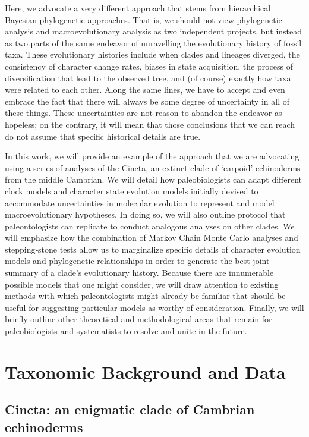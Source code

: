\documentclass{article}
\begin{document}
Here, we advocate a very different approach that stems from hierarchical Bayesian phylogenetic approaches.  
That is, we should not view phylogenetic analysis and macroevolutionary analysis as two independent projects, but instead as two parts of the same endeavor of unravelling the evolutionary history of fossil taxa.  
These evolutionary histories include when clades and lineages diverged, the consistency of character change rates, biases in state acquisition, the process of diversification that lead to the observed tree, and (of course) exactly how taxa were related to each other.  
Along the same lines, we have to accept and even embrace the fact that there will always be some degree of uncertainty in all of these things.  
These uncertainties are not reason to abandon the endeavor as hopeless; on the contrary, it will mean that those conclusions that we can reach do not assume that specific historical details are true.  

In this work, we will provide an example of the approach that we are advocating using a series of analyses of the Cincta, an extinct clade of `carpoid' echinoderms from the middle Cambrian. 
We will detail how paleobiologists can adapt different clock models and character state evolution models initially devised to accommodate uncertainties in molecular evolution to represent and model macroevolutionary hypotheses.  
In doing so, we will also outline protocol that paleontologists can replicate to conduct analogous analyses on other clades.  
We will emphasize how the combination of Markov Chain Monte Carlo analyses and stepping‑stone tests allow us to marginalize specific details of character evolution models and phylogenetic relationships in order to generate the best joint summary of a clade’s evolutionary history.  
Because there are innumerable possible models that one might consider, we will draw attention to existing methods with which paleontologists might already be familiar that should be useful for suggesting particular models as worthy of consideration.  
Finally, we will briefly outline other theoretical and methodological areas that remain for paleobiologists and systematists to resolve and unite in the future. 

\section{Taxonomic Background and Data}
\subsection{Cincta: an enigmatic clade of Cambrian echinoderms}
\end{document}
